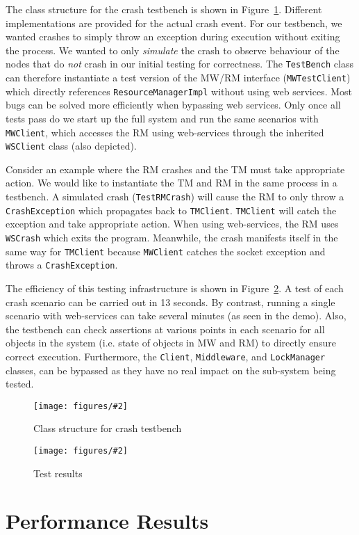 \documentclass{article}
\newcommand{\addfigure}[4]{

\begin{figure}[h]
	\centering
	\texttt{[image: figures/\#2]}
	\caption{#3}
	\label{#4}
\end{figure}

}
\begin{document}
The class structure for the crash testbench is shown in Figure~\ref{f:crash}. Different implementations are provided for the actual crash event. For our testbench, we wanted crashes to simply throw an exception during execution without exiting the process. We wanted to only \textit{simulate} the crash to observe behaviour of the nodes that do \textit{not} crash in our initial testing for correctness. The \texttt{TestBench} class can therefore instantiate a test version of the MW/RM interface (\texttt{MWTestClient}) which directly references \texttt{ResourceManagerImpl} without using web services. Most bugs can be solved more efficiently when bypassing web services. Only once all tests pass do we start up the full system and run the same scenarios with \texttt{MWClient}, which accesses the RM using web-services through the inherited \texttt{WSClient} class (also depicted).

Consider an example where the RM crashes and the TM must take appropriate action. We would like to instantiate the TM and RM in the same process in a testbench. A simulated crash (\texttt{TestRMCrash}) will cause the RM to only throw a \texttt{CrashException} which propagates back to \texttt{TMClient}. \texttt{TMClient} will catch the exception and take appropriate action. When using web-services, the RM uses \texttt{WSCrash} which exits the program. Meanwhile, the crash manifests itself in the same way for \texttt{TMClient} because \texttt{MWClient} catches the socket exception and throws a \texttt{CrashException}.

The efficiency of this testing infrastructure is shown in Figure~\ref{f:test}. A test of each crash scenario can be carried out in 13 seconds. By contrast, running a single scenario with web-services can take several minutes (as seen in the demo). Also, the testbench can check assertions at various points in each scenario for all objects in the system (i.e. state of objects in MW and RM) to directly ensure correct execution. Furthermore, the \texttt{Client}, \texttt{Middleware}, and \texttt{LockManager} classes, can be bypassed as they have no real impact on the sub-system being tested.


\addfigure{0.55}{crash-class.pdf}{Class structure for crash testbench}{f:crash}
\addfigure{0.55}{tests.png}{Test results}{f:test}

\section{Performance Results}
\end{document}
